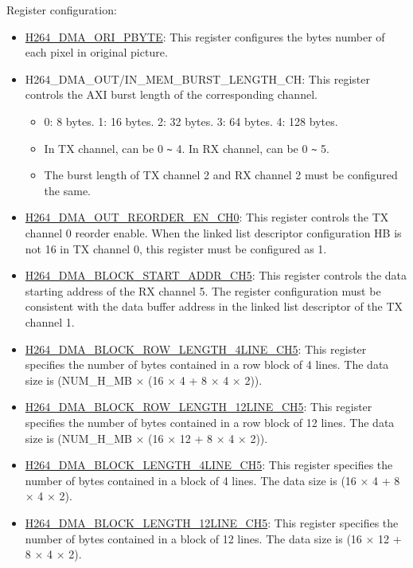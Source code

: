 \documentclass[main\_\_EN.tex]{subfiles}
\begin{document}
Register configuration:
\begin{itemize}
    \item \hyperref[fielddesc:H264DMAORIPBYTE]{H264\_DMA\_ORI\_PBYTE}: This register configures the bytes number of each pixel in original picture.
    \item H264\_DMA\_OUT/IN\_MEM\_BURST\_LENGTH\_CH: This register controls the AXI burst length of the corresponding channel.
    \begin{itemize}
        \item 0: 8 bytes. 1: 16 bytes. 2: 32 bytes. 3: 64 bytes. 4: 128 bytes.
        \item In TX channel,  can be 0 \verb+~+ 4. In RX channel,  can be 0 \verb+~+ 5.
        \item The burst length of TX channel 2 and RX channel 2 must be configured the same.
    \end{itemize}
    \item \hyperref[fielddesc:H264DMAOUTREORDERENCH0]{H264\_DMA\_OUT\_REORDER\_EN\_CH0}: This register controls the TX channel 0 reorder enable. When the linked list descriptor configuration HB is not 16 in TX channel 0, this register must be configured as 1.
    \item \hyperref[fielddesc:H264DMABLOCKSTARTADDRCH5]{H264\_DMA\_BLOCK\_START\_ADDR\_CH5}: This register controls the data starting address of the RX channel 5. The register configuration must be consistent with the data buffer address in the linked list descriptor of the TX channel 1.
    \item \hyperref[fielddesc:H264DMABLOCKROWLENGTH4LINECH5]{H264\_DMA\_BLOCK\_ROW\_LENGTH\_4LINE\_CH5}: This register specifies the number of bytes contained in a row block of 4 lines. The data size is (NUM\_H\_MB × (16 × 4 + 8 × 4 × 2)).
    \item \hyperref[fielddesc:H264DMABLOCKROWLENGTH12LINECH5]{H264\_DMA\_BLOCK\_ROW\_LENGTH\_12LINE\_CH5}: This register specifies the number of bytes contained in a row block of 12 lines. The data size is (NUM\_H\_MB × (16 × 12 + 8 × 4 × 2)).
    \item \hyperref[fielddesc:H264DMABLOCKLENGTH4LINECH5]{H264\_DMA\_BLOCK\_LENGTH\_4LINE\_CH5}: This register specifies the number of bytes contained in a block of 4 lines. The data size is (16 × 4 + 8 × 4 × 2).
    \item \hyperref[fielddesc:H264DMABLOCKLENGTH12LINECH5]{H264\_DMA\_BLOCK\_LENGTH\_12LINE\_CH5}: This register specifies the number of bytes contained in a block of 12 lines. The data size is (16 × 12 + 8 × 4 × 2).
\end{itemize}
\end{document}
